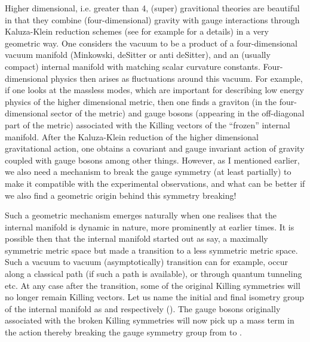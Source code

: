 \documentclass[a4paper,12pt]{article}
\begin{document}
Higher dimensional, i.e. greater than 4, (super) gravitional theories are beautiful in that they combine (four-dimensional) gravity with gauge interactions through Kaluza-Klein reduction  schemes (see for example \cite{kaluza,duff} for a details) in a very geometric way. One considers the vacuum to be a product of a four-dimensional vacuum manifold (Minkowski, deSitter or anti deSitter), and an (usually compact) internal manifold with matching scalar curvature constants. Four-dimensional physics then arises as fluctuations around this vacuum. For example, if one looks at the massless modes, which are  important for describing low energy physics of the higher dimensional metric, then one finds a  graviton (in the four-dimensional sector of the metric) and  gauge bosons (appearing in the off-diagonal part of the metric) associated with the Killing vectors of the ``frozen'' internal manifold. After the Kaluza-Klein reduction of the higher dimensional gravitational action, one obtains a covariant and gauge invariant action of gravity coupled with gauge bosons among other things. However, as I mentioned earlier, we also need a mechanism to break the gauge symmetry (at least partially) to make it compatible with the experimental observations, and what can be better if we also find a geometric origin behind this symmetry breaking! 

Such a geometric mechanism emerges naturally when one realises that the internal manifold is dynamic in nature, more prominently at earlier times. It is possible then that the internal manifold started out as say, a maximally symmetric metric space but made a transition to a less symmetric metric space.  Such a vacuum to vacuum (asymptotically) transition can for example, occur along a classical path (if such a path is available), or through quantum tunneling etc. At any case after the transition, some of the original Killing symmetries will no longer remain Killing vectors. Let us name the initial and final isometry group of the internal manifold as \coordHE{} and \coordHE{} respectively (\coordHE{}). The gauge bosons originally associated with the broken Killing symmetries will now pick up a mass term in the action thereby breaking the gauge symmetry group from \coordHE{} to \coordHE{}. 
\end{document}
